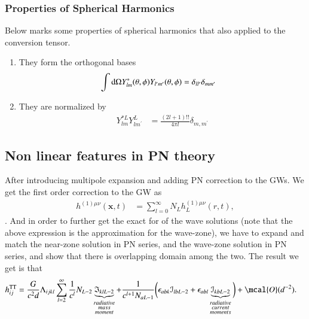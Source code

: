 \documentclass[a4paper, 12pt]{article}
\begin{document}
 \subsubsection{Properties of Spherical Harmonics}%
  \label{sub:Properties of Spherical Harmonics}
  Below marks some properties of spherical harmonics that also applied to
  the conversion tensor. 
  \begin{enumerate}
    \item[\cdot] They form the orthogonal bases 
    \begin{align}
      \label{orthogonality of spherical harmonics}
      \int \textnormal{d}\Omega Y_{lm}^{*}(\theta, \phi) Y_{l^{\prime}
      m^{\prime}}(\theta, \phi) &= \delta_{l l^{\prime}} \delta_{m
      m^{\prime}}   
    \end{align}
    \item[\circ] They are normalized by 
    \begin{align}
      \label{normalization of spherical harmonics}
      Y_{lm}^{*L} Y_{l m^{\prime}}^{L} &=  \frac{(2l+1)!!}{4\pi l}
      \delta_{m, m^{\prime}} 
    \end{align}
  \end{enumerate}

 \subsection{Non linear features in PN theory}%
  \label{sub:Non linear features in PN theory}
  After introducing multipole expansion and adding PN correction
  to the GWs. We get the first order correction to the GW as 
  \begin{align}
    \label{1st order in PN}
    h^{(1) \mu \nu} ( \textbf{x}, t )  &= \sum_{l=0}^{\infty} N_{L}
    h_{L}^{(1) \mu \nu} (r, t), 
  \end{align}. And in order to further get the exact for of the wave
  solutions (note that the above expression is the approximation for the
  wave-zone), we have to expand and match the near-zone solution in PN
  series, and the wave-zone solution in PN series, and show that there is
  overlapping domain among the two. The result we get is that 
  \begin{align}
    \label{PN GW in multipole moments}
      h_{ij}^{\mathrm{TT}} &= \frac{G}{c^2 d} \Lambda_{ijkl}
      \sum_{l=2}^{\infty} \frac{1}{c^l} N_{L-2}
      \underbrace{\mathfrak{I}_{kl
      L-2}}_{\substack{radiative\\mass\\moment}} +
      \frac{1}{c^{l+1}N_{aL-1} }  \bigg(\epsilon_{abk}
      \mathcal{I}_{lbL-2} + \epsilon_{abl}
      \underbrace{\mathcal{I}_{kbL-2}}_{\substack{radiative\\current\\moments}}
      \bigg)  + \mcal{O}(d^{-2} ).
  \end{align}
  
\end{document}
